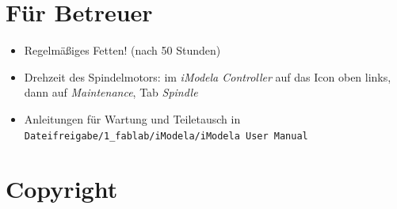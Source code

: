 \documentclass{\basedir/fablab-document}
\begin{document}
\section{Für Betreuer}
\begin{itemize}
	\item Regelmäßiges Fetten! (nach 50 Stunden)
	\item Drehzeit des Spindelmotors: im \emph{iModela Controller} auf das Icon oben links, dann auf \emph{Maintenance}, Tab \emph{Spindle} 
	\item Anleitungen für Wartung und Teiletausch in \texttt{Dateifreigabe/1\_fablab/iModela/iModela User Manual}
\end{itemize}

\section{Copyright}
\end{document}
